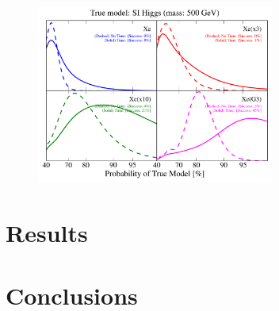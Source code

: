 \documentclass[11pt]{article}
\begin{document}
\begin{figure}
\centering
\includegraphics[width=0.7\textwidth]{plots/PDF_500GeV_SI_Higgs_50sims_Xe_Xe3x_Xe10x_XeG3_GF_TNT.pdf}
\caption{\label{fig:500gev_anapole_XeFull_TNT_GF}}
\end{figure}





\section{Results}

\section{Conclusions}





\end{document}

